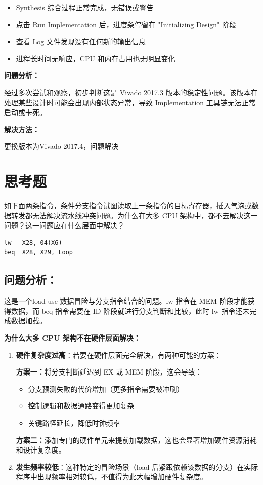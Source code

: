 \documentclass[12pt,a4paper]{article}
\begin{document}
\begin{itemize}
    \item Synthesis 综合过程正常完成，无错误或警告
    \item 点击 Run Implementation 后，进度条停留在 "Initializing Design" 阶段
    \item 查看 Log 文件发现没有任何新的输出信息
    \item 进程长时间无响应，CPU 和内存占用也无明显变化
\end{itemize}

\textbf{问题分析：}

经过多次尝试和观察，初步判断这是 Vivado 2017.3 版本的稳定性问题。该版本在处理某些设计时可能会出现内部状态异常，导致 Implementation 工具链无法正常启动或卡死。

\textbf{解决方法：}

更换版本为Vivado 2017.4，问题解决

\clearpage
\section{思考题}

如下面两条指令，条件分支指令试图读取上一条指令的目标寄存器，插入气泡或数据转发都无法解决流水线冲突问题。为什么在大多 CPU 架构中，都不去解决这一问题？这一问题应在什么层面中解决？

\begin{lstlisting}[language={[x86masm]Assembler}]
lw   X28, 04(X6)
beq  X28, X29, Loop
\end{lstlisting}

\subsection{问题分析：}

这是一个load-use 数据冒险与分支指令结合的问题。lw 指令在 MEM 阶段才能获得数据，而 beq 指令需要在 ID 阶段就进行分支判断和比较，此时 lw 指令还未完成数据加载。

\textbf{为什么大多 CPU 架构不在硬件层面解决：}

\begin{enumerate}
    \item \textbf{硬件复杂度过高}：若要在硬件层面完全解决，有两种可能的方案：
    
    \textbf{方案一：}将分支判断延迟到 EX 或 MEM 阶段，这会导致：
    \begin{itemize}
        \item 分支预测失败的代价增加（更多指令需要被冲刷）
        \item 控制逻辑和数据通路变得更加复杂
        \item 关键路径延长，降低时钟频率
    \end{itemize}
    
    \textbf{方案二：}添加专门的硬件单元来提前加载数据，这也会显著增加硬件资源消耗和设计复杂度。
    
    \item \textbf{发生频率较低}：这种特定的冒险场景（load 后紧跟依赖该数据的分支）在实际程序中出现频率相对较低，不值得为此大幅增加硬件复杂度。
\end{enumerate}
\end{document}

